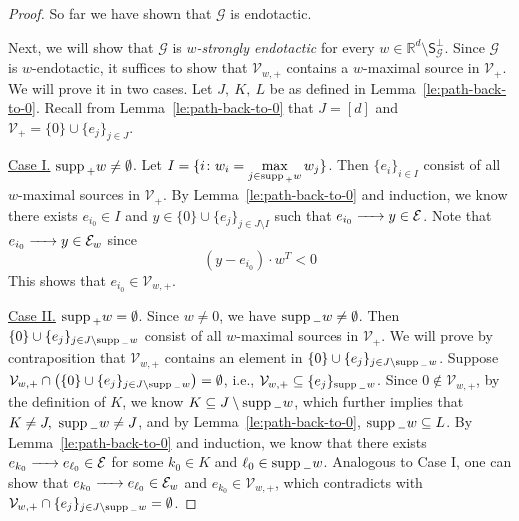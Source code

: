 \documentclass[10pt]{amsart}
\numberwithin{equation}{section}
\theoremstyle{plain}
\theoremstyle{definition}
\theoremstyle{remark}
\newcommand{\cE}{\mathcal{E}}
\newcommand{\cG}{\mathcal{G}}
\newcommand{\cV}{\mathcal{V}}
\newcommand{\supp}{{\rm supp\,}}
\begin{document}
\begin{proof}
So far we have shown that $\cG$ is endotactic.

Next, we will show that $\cG$ is \emph{$w$-strongly endotactic} for every $w\in\mathbb{R}^d\setminus\mathsf{S}_{\cG}^{\perp}$. Since $\cG$ is $w$-endotactic, it suffices to show that $\cV_{w,+}$ contains a $w$-maximal source in $\cV_+$. We will prove it in two cases. Let $J,\ K,\ L$ be as defined in Lemma~\ref{le:path-back-to-0}. Recall from  Lemma~\ref{le:path-back-to-0} that $J=[d]$ and $\cV_+=\{0\}\cup\{e_j\}_{j\in J}$.
\medskip

\noindent \underline{Case I.} $\supp_+w\neq\emptyset$. Let $I=\{i\colon  w_i=\max\limits_{j\in\supp_+w} w_j\}$. Then $\{e_i\}_{i\in I}$ consist of all $w$-maximal sources in $\cV_+$. By Lemma~\ref{le:path-back-to-0} and induction,  we know there exists $e_{i_0}\in I$ and $y\in\{0\}\cup\{e_j\}_{j\in J\setminus I}$ such that $e_{i_0}\ce{->}y\in\cE$. Note that $e_{i_0}\ce{->}y\in\cE_w$ since \[(y-e_{i_0})\cdot w^T<0\] This shows that $e_{i_0}\in\cV_{w,+}$.
\medskip

\noindent \underline{Case II.} $\supp_+w=\emptyset$.  Since $w\neq0$, we have $\supp_-w\neq\emptyset$. Then $\{0\}\cup\{e_j\}_{j\in J\setminus\supp_-w}$ consist of all $w$-maximal sources in $\cV_+$. We will prove by contraposition that $\cV_{w,+}$ contains an element in $\{0\}\cup\{e_j\}_{j\in J\setminus\supp_-w}$. Suppose $\cV_{w,+}\cap \bigl(\{0\}\cup\{e_j\}_{j\in J\setminus\supp_-w}\bigr)=\emptyset$, i.e., $\cV_{w,+}\subseteq\{e_j\}_{\supp_-w}$. Since $0\notin\cV_{w,+}$, by the definition of $K$, we know $K\subseteq J\setminus\supp_-w$, which further implies that $K\neq J,\ \supp_-w\neq J$, and by Lemma~\ref{le:path-back-to-0}, $\supp_-w\subseteq L$. By Lemma~\ref{le:path-back-to-0} and induction,  we know that there exists $e_{k_0}\ce{->}e_{\ell_0}\in\cE$ for some $k_0\in K$ and $\ell_0\in \supp_-w$. Analogous to Case I, one can show that $e_{k_0}\ce{->}e_{\ell_0}\in\cE_w$ and $e_{k_0}\in\cV_{w,+}$, which contradicts with $\cV_{w,+}\cap \{e_j\}_{j\in J\setminus\supp_-w}=\emptyset$.

\end{proof}
\end{document}
